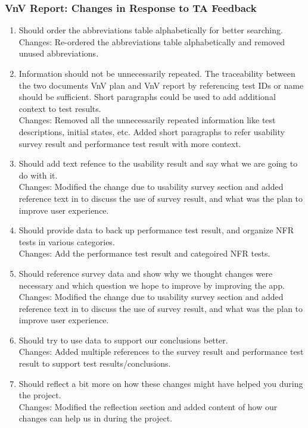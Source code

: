 \documentclass{article}
\begin{document}
\subsubsection{VnV Report: Changes in Response to TA Feedback}
\begin{enumerate}
        \item Should order the abbreviations table alphabetically for better searching. \\
        Changes: Re-ordered the abbreviations table alphabetically and removed unused abbreviations.
        \item Information should not be unnecessarily repeated. The traceability between the two documents VnV plan and VnV report by referencing test IDs or name should be sufficient. Short paragraphs could be used to add additional context to test results. \\
        Changes: Removed all the unnecessarily repeated information like test descriptions, initial states, etc. Added short paragraphs to refer usability survey result and performance test result with more context.
        \item Should add text refence to the usability result and say what we are going to do with it. \\
        Changes: Modified the change due to usability survey section and added reference text in to discuss the use of survey result, and what was the plan to improve user experience.
        \item Should provide data to back up performance test result, and organize NFR tests in various categories. \\
        Changes: Add the performance test result and categoired NFR tests.
        \item Should reference survey data and show why we thought changes were necessary and which question we hope to improve by improving the app.\\
        Changes: Modified the change due to usability survey section and added reference text in to discuss the use of survey result, and what was the plan to improve user experience.
        \item Should try to use data to support our conclusions better.\\
        Changes: Added multiple references to the survey result and performance test result to support test results/conclusions.
        \item Should reflect a bit more on how these changes might have helped you during the project.\\
        Changes: Modified the reflection section and added content of how our changes can help us in during the project.
\end{enumerate} 
\end{document}
